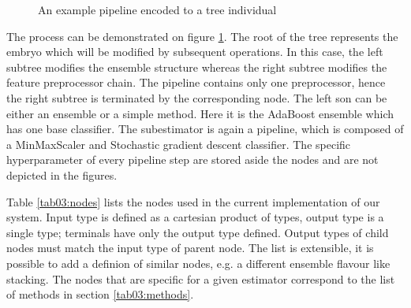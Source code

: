 \begin{figure}[ht]\centering
    \qquad
    \caption{An example pipeline encoded to a tree individual}%
    \label{pic:pipeencoding}%
\end{figure}

The process can be demonstrated on figure
\ref{pic:pipeencoding}. The root of the tree represents the embryo which will
be modified by subsequent operations. In this case, the left subtree modifies
the ensemble structure whereas the right subtree modifies the feature
preprocessor chain. The pipeline contains only one preprocessor, hence the
right subtree is terminated by the corresponding node. The left son can be
either an ensemble or a simple method. Here it is the AdaBoost ensemble which
has one base classifier. The subestimator is again a pipeline, which is composed
of a MinMaxScaler and Stochastic gradient descent classifier. The specific
hyperparameter of every pipeline step are stored aside the nodes and are not
depicted in the figures.

Table \ref{tab03:nodes} lists the nodes used in the current implementation of
our system. Input type is defined as a cartesian product of types, output type
is a single type; terminals have only the output type defined. Output types of
child nodes must match the input type of parent node. The list is extensible,
it is possible to add a definion of similar nodes, e.g. a different ensemble
flavour like stacking. The nodes that are specific for a given estimator
correspond to the list of methods in section \ref{tab03:methods}.

